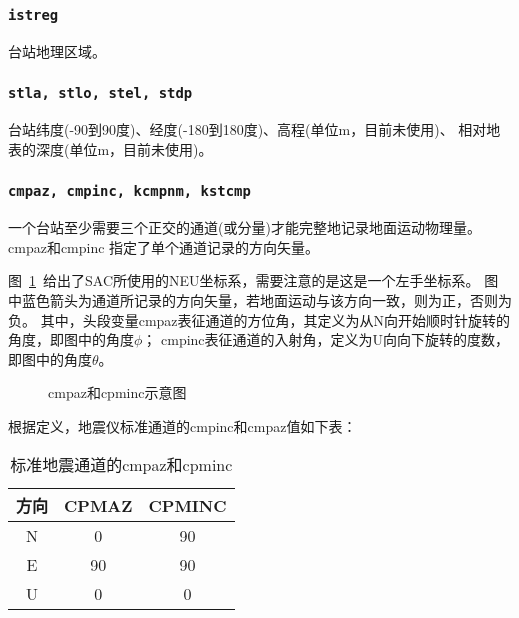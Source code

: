 \subsubsection{\texttt{istreg}\dag}
台站地理区域。

\subsubsection{\texttt{stla, stlo, stel, stdp}}
台站纬度(-90到90度)、经度(-180到180度)、高程(单位m，目前未使用)、
相对地表的深度(单位m，目前未使用)。

\subsubsection{\texttt{cmpaz, cmpinc, kcmpnm, kstcmp}}
一个台站至少需要三个正交的通道(或分量)才能完整地记录地面运动物理量。cmpaz和cmpinc
指定了单个通道记录的方向矢量。

图~\ref{fig:cmpaz-cmpinc}~给出了SAC所使用的NEU坐标系，需要注意的是这是一个左手坐标系。
图中蓝色箭头为通道所记录的方向矢量，若地面运动与该方向一致，则为正，否则为负。
其中，头段变量cmpaz表征通道的方位角，其定义为从N向开始顺时针旋转的角度，即图中的角度$\phi$；
cmpinc表征通道的入射角，定义为U向向下旋转的度数，即图中的角度$\theta$。

\begin{figure}[H]
\centering
{}
\caption{cmpaz和cpminc示意图}
\label{fig:cmpaz-cmpinc}
\end{figure}

根据定义，地震仪标准通道的cmpinc和cmpaz值如下表：
\begin{table}[H]
\caption{标准地震通道的cmpaz和cpminc}
\label{table:neu-cmpaz-cmpinc}
\centering
\begin{tabular}{ccc}
\toprule
方向    &   CPMAZ   &   CPMINC      \\
\midrule
N       &   0       &   90          \\
E       &   90      &   90          \\
U       &   0       &   0           \\
\bottomrule
\end{tabular}
\end{table}

